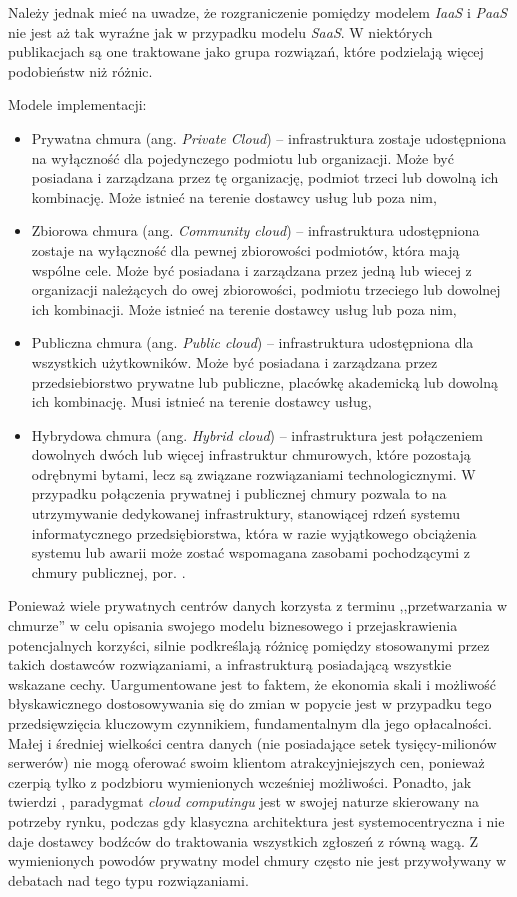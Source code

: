 \documentclass[12pt,a4paper,twoside]{article}
\begin{document}
Należy jednak mieć na uwadze, że rozgraniczenie pomiędzy modelem \textit{IaaS} i \textit{PaaS} nie jest aż tak wyraźne jak w przypadku modelu \textit{SaaS}. W niektórych publikacjach \citep{armburst2010} są one traktowane jako grupa rozwiązań, które podzielają więcej podobieństw niż różnic.

\noindent
Modele implementacji:
\begin{itemize}
\item Prywatna chmura (ang. \textit{Private Cloud}) -- infrastruktura zostaje udostępniona na wyłączność dla pojedynczego podmiotu lub organizacji. Może być posiadana i zarządzana przez tę organizację, podmiot trzeci lub dowolną ich kombinację. Może istnieć na terenie dostawcy usług lub poza nim,
\item Zbiorowa chmura (ang. \textit{Community cloud}) -- infrastruktura udostępniona zostaje na wyłączność dla pewnej zbiorowości podmiotów, która mają wspólne cele. Może być posiadana i zarządzana przez jedną lub wiecej z organizacji należących do owej zbiorowości, podmiotu trzeciego lub dowolnej ich kombinacji. Może istnieć na terenie dostawcy usług lub poza nim,
\item Publiczna chmura (ang. \textit{Public cloud}) -- infrastruktura udostępniona dla wszystkich użytkowników. Może być posiadana i zarządzana przez przedsiebiorstwo prywatne lub publiczne, placówkę akademicką lub dowolną ich kombinację. Musi istnieć na terenie dostawcy usług,
\item Hybrydowa chmura (ang. \textit{Hybrid cloud}) -- infrastruktura jest połączeniem dowolnych dwóch lub więcej infrastruktur chmurowych, które pozostają odrębnymi bytami, lecz są związane rozwiązaniami technologicznymi. W przypadku połączenia prywatnej i publicznej chmury pozwala to na utrzymywanie dedykowanej infrastruktury, stanowiącej rdzeń systemu informatycznego przedsiębiorstwa, która w razie wyjątkowego obciążenia systemu lub awarii może zostać wspomagana zasobami pochodzącymi z chmury publicznej, por. \citet{antonopoulos2010}.
\end{itemize}

Ponieważ wiele prywatnych centrów danych korzysta z terminu ,,przetwarzania w chmurze'' w celu opisania swojego modelu biznesowego i przejaskrawienia potencjalnych korzyści, \citet{armburst2010} silnie podkreślają różnicę pomiędzy stosowanymi przez takich dostawców rozwiązaniami, a infrastrukturą posiadającą wszystkie wskazane cechy. Uargumentowane jest to faktem, że ekonomia skali i możliwość błyskawicznego dostosowywania się do zmian w popycie jest w przypadku tego przedsięwzięcia kluczowym czynnikiem, fundamentalnym dla jego opłacalności. Małej i średniej wielkości centra danych (nie posiadające setek tysięcy-milionów serwerów) nie mogą oferować swoim klientom atrakcyjniejszych cen, ponieważ czerpią tylko z podzbioru wymienionych wcześniej możliwości. Ponadto, jak twierdzi , paradygmat \textit{cloud computingu} jest w swojej naturze skierowany na potrzeby rynku, podczas gdy klasyczna architektura jest systemocentryczna i nie daje dostawcy bodźców do traktowania wszystkich zgłoszeń z równą wagą. Z wymienionych powodów prywatny model chmury często nie jest przywoływany w debatach nad tego typu rozwiązaniami.
\end{document}
